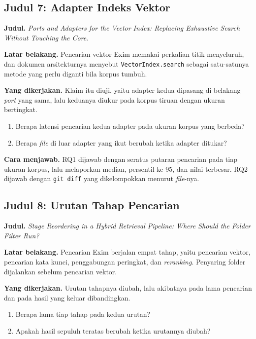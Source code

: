 \subsection*{Judul 7: Adapter Indeks Vektor}

\textbf{Judul.} \textit{Ports and Adapters for the Vector Index: Replacing Exhaustive Search Without Touching the Core}.

\textbf{Latar belakang.} Pencarian vektor Exim memakai perkalian titik
menyeluruh, dan dokumen arsitekturnya menyebut \texttt{VectorIndex.search}
sebagai satu-satunya metode yang perlu diganti bila korpus tumbuh.

\textbf{Yang dikerjakan.} Klaim itu diuji, yaitu adapter kedua dipasang di
belakang \textit{port} yang sama, lalu keduanya diukur pada
korpus tiruan
dengan ukuran bertingkat.

\begin{enumerate}
  \item Berapa latensi pencarian kedua adapter pada ukuran korpus yang
    berbeda?
  \item Berapa \textit{file} di luar adapter yang ikut berubah ketika adapter ditukar?
\end{enumerate}

\textbf{Cara menjawab.} RQ1 dijawab dengan seratus putaran pencarian pada tiap
ukuran korpus, lalu melaporkan median, persentil
ke-95, dan nilai terbesar.
RQ2 dijawab dengan \texttt{git diff} yang dikelompokkan menurut \textit{file}-nya.

\subsection*{Judul 8: Urutan Tahap Pencarian}

\textbf{Judul.} \textit{Stage Reordering in a Hybrid Retrieval Pipeline: Where Should the Folder Filter Run?}

\textbf{Latar belakang.} Pencarian Exim berjalan empat tahap, yaitu pencarian
vektor, pencarian kata kunci, penggabungan peringkat, dan \textit{reranking}.
Penyaring folder dijalankan sebelum pencarian vektor.

\textbf{Yang dikerjakan.} Urutan tahapnya diubah, lalu akibatnya pada lama
pencarian dan pada hasil yang keluar dibandingkan.

\begin{enumerate}
  \item Berapa lama tiap tahap pada kedua urutan?
  \item Apakah hasil sepuluh teratas berubah ketika urutannya diubah?
\end{enumerate}

